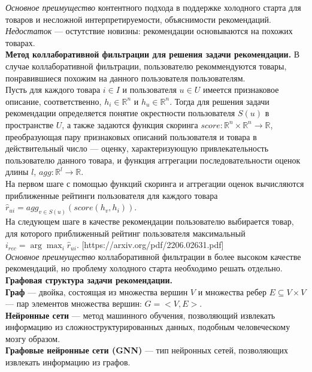 \documentclass{mipt-thesis-ms}
\begin{document}
{\it Основное преимущество} контентного подхода в поддержке холодного старта для товаров и несложной интерпретируемости, объяснимости рекомендаций. {\it Недостаток} --- остутствие новизны: рекомендации основываются на похожих товарах.\\

{\bf Метод коллаборативной фильтрации для решения задачи рекомендации.} В случае коллаборативной фильтрации, пользователю рекоммендуются товары, понравившиеся похожим на данного пользователя пользователям.\\

Пусть для каждого товара $i \in I$ и пользователя $u \in U$ имеется признаковое описание, соответственно, $h_i \in \mathbb{R}^n$ и $h_u \in \mathbb{R}^n$. Тогда для решения задачи рекомендации определяется понятие окрестности пользователя $S(u)$ в пространстве $U$, а также задаются функция скоринга $score: \mathbb{R}^n \times \mathbb{R}^n \rightarrow \mathbb{R}$, преобразующая пару признаковых описаний пользователя и товара в действительный число --- оценку, характеризующую привлекательность пользователю данного товара, и функция аггрегации последовательности оценок длины $l$, $agg: \mathbb{R}^l \rightarrow \mathbb{R}$. \\
На первом шаге с помощью функций скоринга и аггрегации оценок вычисляются приближенные рейтинги пользователя для каждого товара $\hat r_{ui} = {agg}_{v \in S(u)}(score(h_v, h_i))$. \\
На следующем шаге в качестве рекомендации пользователю выбирается товар, для которого приближенный рейтинг пользователя максимальный $i_{rec} = \arg \max_i \hat r_{ui}$. [https://arxiv.org/pdf/2206.02631.pdf]
\\

{\it Основное преимущество} коллаборативной фильтрации в более высоком качестве рекомендаций, но проблему холодного старта необходимо решать отдельно.
\\

{\bf Графовая структура задачи рекомендации.}\\
{\bf Граф} --- двойка, состоящая из множества вершин $V$ и множества ребер $E \subseteq V \times V$ --- пар элементов множества вершин: \:$G = <V, E>$.\\
{\bf Нейронные сети} --- метод машинного обучения, позволяющий извлекать информацию из сложноструктурированных данных, подобным человеческому мозгу образом.\\
{\bf Графовые нейронные сети (GNN)} --- тип нейронных сетей, позволяющих извлекать информацию из графов. \\
\end{document}

